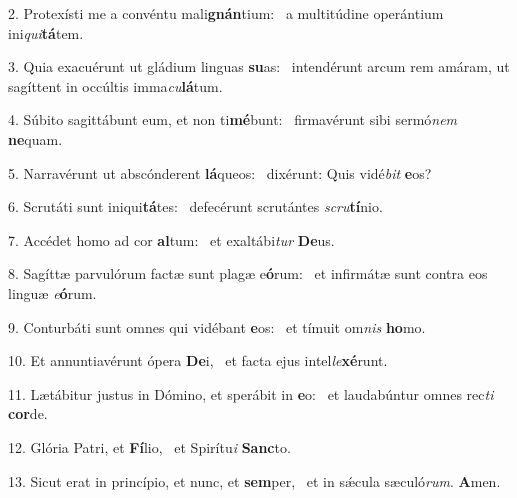 2. Protexísti me a convéntu mali\textbf{gnán}tium: \ast\  a multitúdine operántium ini\textit{qui}\textbf{tá}tem.\

3. Quia exacuérunt ut gládium linguas \textbf{su}as: \ast\  intendérunt arcum rem amáram, ut sagíttent in occúltis imma\textit{cu}\textbf{lá}tum.\

4. Súbito sagittábunt eum, et non ti\textbf{mé}bunt: \ast\  firmavérunt sibi sermó\textit{nem} \textbf{ne}quam.\

5. Narravérunt ut abscónderent \textbf{lá}queos: \ast\  dixérunt: Quis vidé\textit{bit} \textbf{e}os?\

6. Scrutáti sunt iniqui\textbf{tá}tes: \ast\  defecérunt scrutántes \textit{scru}\textbf{tí}nio.\

7. Accédet homo ad cor \textbf{al}tum: \ast\  et exaltábi\textit{tur} \textbf{De}us.\

8. Sagíttæ parvulórum factæ sunt plagæ e\textbf{ó}rum: \ast\  et infirmátæ sunt contra eos linguæ \textit{e}\textbf{ó}rum.\

9. Conturbáti sunt omnes qui vidébant \textbf{e}os: \ast\  et tímuit om\textit{nis} \textbf{ho}mo.\

10. Et annuntiavérunt ópera \textbf{De}i, \ast\  et facta ejus intel\textit{le}\textbf{xé}runt.\

11. Lætábitur justus in Dómino, et sperábit in \textbf{e}o: \ast\  et laudabúntur omnes rec\textit{ti} \textbf{cor}de.\

12. Glória Patri, et \textbf{Fí}lio, \ast\  et Spirítu\textit{i} \textbf{Sanc}to.\

13. Sicut erat in princípio, et nunc, et \textbf{sem}per, \ast\  et in sǽcula sæculó\textit{rum}. \textbf{A}men.\


